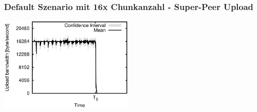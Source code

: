 \begin{frame}
  \frametitle{Default Szenario mit 16x Chunkanzahl - Super-Peer Upload}
  \begin{center}
    \includegraphics[width=0.49\textwidth]{fig/plots/scenario_17_chunk_count_fac_16/plots/GeneratedMeanCurrentSuperSeederUploadBandwidth.csv.eps}
  \end{center}
\end{frame}
